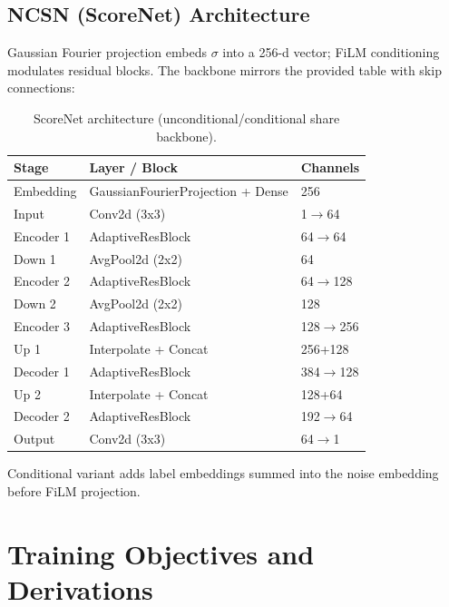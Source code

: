 \documentclass[a4paper,12pt]{article}
\begin{document}
\subsection{NCSN (ScoreNet) Architecture}
Gaussian Fourier projection embeds $\sigma$ into a 256-d vector; FiLM conditioning modulates residual blocks. The backbone mirrors the provided table with skip connections:
\begin{table}[H]
\centering
\caption{ScoreNet architecture (unconditional/conditional share backbone).}
\begin{tabular}{lll}
\toprule
Stage & Layer / Block & Channels \\
\midrule
Embedding & GaussianFourierProjection + Dense & 256 \\
Input & Conv2d (3x3) & 1$\rightarrow$64 \\
Encoder 1 & AdaptiveResBlock & 64$\rightarrow$64 \\
Down 1 & AvgPool2d (2x2) & 64 \\
Encoder 2 & AdaptiveResBlock & 64$\rightarrow$128 \\
Down 2 & AvgPool2d (2x2) & 128 \\
Encoder 3 & AdaptiveResBlock & 128$\rightarrow$256 \\
Up 1 & Interpolate + Concat & 256+128 \\
Decoder 1 & AdaptiveResBlock & 384$\rightarrow$128 \\
Up 2 & Interpolate + Concat & 128+64 \\
Decoder 2 & AdaptiveResBlock & 192$\rightarrow$64 \\
Output & Conv2d (3x3) & 64$\rightarrow$1 \\
\bottomrule
\end{tabular}
\end{table}
Conditional variant adds label embeddings summed into the noise embedding before FiLM projection.

\section{Training Objectives and Derivations}
\end{document}

